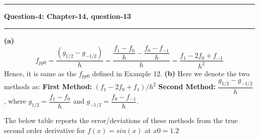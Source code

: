 \documentclass{article}
\newcommand\question[2]{\vspace{.25in}\hrule\textbf{#1: #2}\hrule\vspace{.10in}}
\renewcommand\part[1]{\vspace{.10in}\textbf{(#1)}}
\begin{document}
  

  \question{Question-4}{Chapter-14, question-13}

  \part{a} 
	  \[f_{pp0} = \dfrac{(g_{1/2} - g_{-1/2})}{h} = \dfrac{\dfrac{f_1 - f_0}{h} - \dfrac{f_0 - f_{-1}}{h}}{h} = \dfrac{f_1 -2f_0 + f_{-1}}{h^2}\]
	  Hence, it is same as the $f_{pp0}$ defined in Example 12. \newline
  \part{b} Here we denote the two methods as:\newline
	  \textbf{First Method:} $(f_1 - 2f_0 + f_1)/h^2$ \newline
	  \textbf{Second Method:} $\dfrac{g_{1/2} - g_{-1/2}}{h}$, where $g_{1/2} = \dfrac{f_1 - f_0}{h}$ and $g_{-1/2} = \dfrac{f_0 - f_{-1}}{h}$.

	  The below table reports the error/deviations of these methods from the true second order derivative for $f(x)=sin(x)$ at $x0=1.2$
\end{document}
